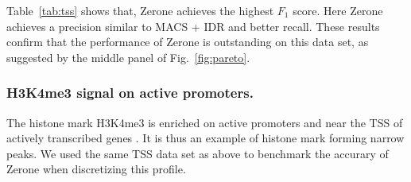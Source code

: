 \documentclass{bioinfo}
\begin{document}
Table~\ref{tab:tss} shows that, Zerone achieves the highest $F_1$
score. Here Zerone achieves a precision similar to MACS + IDR and
better recall. These results confirm that the performance of Zerone is
outstanding on this data set, as suggested by the middle panel of
Fig.~\ref{fig:pareto}.

\subsubsection{H3K4me3 signal on active promoters.}
\label{subsub:h3k4me3}
The histone mark H3K4me3 is enriched on active promoters and
near the TSS of actively transcribed genes
\citep{pmid15680324,pmid17512414,pmid17277777}. It is thus an example
of histone mark forming narrow peaks. We used the same TSS data set
as above to benchmark the accurary of Zerone when discretizing
this profile.
\end{document}

